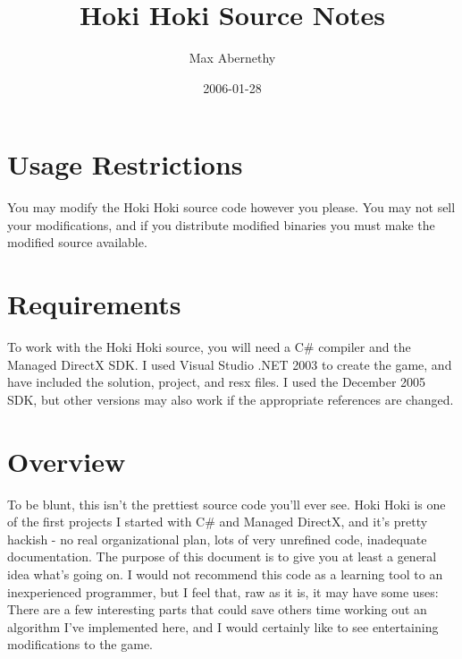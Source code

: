 \documentclass [12pt]{article}
\title{Hoki Hoki Source Notes}
\author{Max Abernethy}
\date{2006-01-28}
\begin{document}
\maketitle

\section{Usage Restrictions}
You may modify the Hoki Hoki source code however you please. You may not sell your modifications, and if you distribute modified binaries you must make the modified source available.
\section{Requirements}
To work with the Hoki Hoki source, you will need a C\# compiler and the Managed DirectX SDK. I used Visual Studio .NET 2003 to create the game, and have included the solution, project, and resx files. I used the December 2005 SDK, but other versions may also work if the appropriate references are changed.
\section{Overview}
To be blunt, this isn't the prettiest source code you'll ever see. Hoki Hoki is one of the first projects I started with C\# and Managed DirectX, and it's pretty hackish - no real organizational plan, lots of very unrefined code, inadequate documentation. The purpose of this document is to give you at least a general idea what's going on. I would not recommend this code as a learning tool to an inexperienced programmer, but I feel that, raw as it is, it may have some uses: There are a few interesting parts that could save others time working out an algorithm I've implemented here, and I would certainly like to see entertaining modifications to the game.
\end{document}
